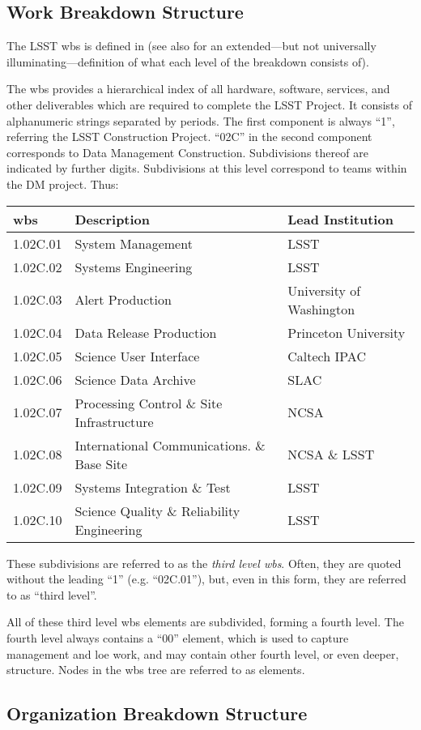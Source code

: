 \subsection{Work Breakdown Structure}
\label{sec:wbs}

The LSST \gls{wbs} is defined in  (see also  for an extended---but not universally illuminating---definition of what each level of the breakdown consists of).

The \gls{wbs} provides a hierarchical index of all hardware, software, services, and other deliverables which are required to complete the LSST Project.
It consists of alphanumeric strings separated by periods.
The first component is always ``1'', referring the LSST Construction Project.
``02C'' in the second component corresponds to Data Management Construction.
Subdivisions thereof are indicated by further digits.
Subdivisions at this level correspond to teams within the DM project.
Thus:

\begin{longtable}[]{@{}lll@{}}
\hline
\gls{wbs} & Description & Lead Institution\tabularnewline
\hline
\endhead
1.02C.01 & System Management & LSST\tabularnewline
1.02C.02 & Systems Engineering & LSST\tabularnewline
1.02C.03 & Alert Production & University of Washington\tabularnewline
1.02C.04 & Data Release Production & Princeton University\tabularnewline
1.02C.05 & Science User Interface & Caltech IPAC\tabularnewline
1.02C.06 & Science Data Archive & SLAC\tabularnewline
1.02C.07 & Processing Control \& Site Infrastructure &
NCSA\tabularnewline
1.02C.08 & International Communications. \& Base Site & NCSA \&
LSST\tabularnewline
1.02C.09 & Systems Integration \& Test & LSST\tabularnewline
1.02C.10 & Science Quality \& Reliability Engineering &
LSST\tabularnewline
\hline
\end{longtable}

These subdivisions are referred to as the \emph{third level \gls{wbs}}.
Often, they are quoted without the leading ``1'' (e.g. ``02C.01''), but, even in this form, they are referred to as ``third level''.

All of these third level \gls{wbs} \glspl{element} are subdivided, forming a fourth level.
The fourth level always contains a ``00'' \gls{element}, which is used to capture management and \gls{loe} work, and may contain other fourth level, or even deeper, structure.
Nodes in the \gls{wbs} tree are referred to as \glspl{element}.

\subsection{Organization Breakdown
Structure}\label{organization-breakdown-structure}

